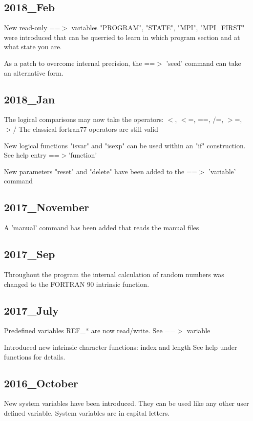 \subsection*{2018\_Feb}
\par
New read-only ==$> $ variables "PROGRAM", "STATE", "MPI", "MPI\_FIRST" 
were introduced that can be querried to learn in which program 
section and at what state you are. 
\par
As a patch to overcome internal precision, the ==$> $ 'seed' command 
can take an alternative form. 
\subsection*{2018\_Jan}
\par
The logical comparisons may now take the operators: 
$ <$, $ <$=, ==, /=, $> $=, $> $/ 
The classical fortran77 operators are still valid 
\par
New logical functions "isvar" and "isexp" can be used within an 
"if" construction. See help entry ==$> $'function' 
\par
New parameters "reset" and "delete" have been added to the 
==$> $ 'variable' command 
\subsection*{2017\_November}
\par
A 'manual' command has been added that reads the manual files 
\subsection*{2017\_Sep}
\par
Throughout the program the internal calculation of random numbers 
was changed to the FORTRAN 90 intrinsic function. 
\subsection*{2017\_July}
\par
Predefined variables REF\_* are now read/write. See ==$> $ variable 
\par
Introduced new intrinsic character functions: index and length 
See help under functions for details. 
\subsection*{2016\_October}
\par
New system variables have been introduced. They can be used like any 
other user defined variable. System variables are in capital letters. 
